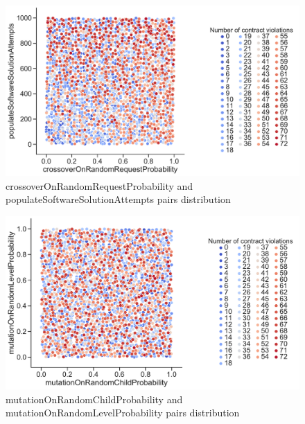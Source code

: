 \begin{figure}
	\centering
	\includegraphics[width=\textwidth]{images/PairsDistr/crossoverOnRandomRequestProbability_populateSoftwareSolutionAttempts.pdf}
	\caption[crossoverOnRandomRequestProbability and populateSoftwareSolutionAttempts pairs distribution]{crossoverOnRandomRequestProbability and populateSoftwareSolutionAttempts pairs distribution}
	\label{fig:crossoverOnRandomRequestProbability_populateSoftwareSolutionAttempts_pair}
\end{figure}
\begin{figure}
	\centering
	\includegraphics[width=\textwidth]{images/PairsDistr/mutationOnRandomChildProbability_mutationOnRandomLevelProbability.pdf}
	\caption[mutationOnRandomChildProbability and mutationOnRandomLevelProbability pairs distribution]{mutationOnRandomChildProbability and mutationOnRandomLevelProbability pairs distribution} 
	\label{fig:mutationOnRandomChildProbability_mutationOnRandomLevelProbability_pair}
\end{figure}
